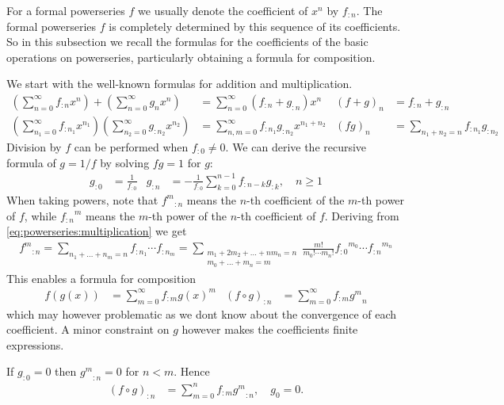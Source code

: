 \documentclass{article}
\numberwithin{equation}{section}
\begin{document}
For a formal powerseries $f$ we usually denote the coefficient of
$x^n$ by $f_{:n}$. The formal powerseries $f$ is completely determined by
this sequence of its coefficients. So in this subsection we 
recall the formulas for the coefficients of the basic operations on
powerseries, particularly obtaining a formula for composition.


We start with the well-known formulas for addition and
multiplication.
\begin{align}
  \left(\sum_{n=0}^\infty f_{:n} x^n\right) + \left(\sum_{n=0}^\infty
    g_n x^n\right)&=\sum_{n=0}^\infty (f_{:n}+g_{:n})x^n & (f+g)_n &=
  f_{:n} + g_{:n}\label{eq:powerseries:addition}\\
  \left(\sum_{n_1=0}^\infty f_{:n_1} x^{n_1}\right)
  \left(\sum_{n_2=0}^\infty g_{:n_2} x^{n_2}\right)&=
  \sum_{n,m=0}^\infty f_{:n_1} g_{:n_2} x^{n_1+n_2} &
(fg)_n &= \sum_{n_1+n_2=n} f_{:n_1} g_{:n_2}\label{eq:powerseries:multiplication}
\end{align}
Division by $f$ can be performed when $f_{:0}\neq 0$. We can derive the
recursive formula of $g=1/f$ by solving $fg=1$ for $g$:
\begin{align*}
  g_{:0} &= \frac{1}{f_{:0}} & g_{:n} &=
  -\frac{1}{f_{:0}}\sum_{k=0}^{n-1} f_{:n-k}
  g_{:k},\quad n\ge 1
\end{align*}
When taking powers, note that ${f^m}_{:n}$ means the $n$-th coefficient of
the $m$-th power of $f$, while ${f_{:n}}^m$ means the $m$-th power of the
$n$-th coefficient of $f$. Deriving from
\eqref{eq:powerseries:multiplication} we get
\begin{align}\label{eq:powerseries:power}
  {f^m}_{:n} = \sum_{n_1+\dots+n_m=n} f_{:n_1}\dotsm f_{:n_m} =
  \sum_{\substack{m_1+2m_2+\dots+nm_n = n\\m_0+\dots+m_n=m}}
    \frac{m!}{m_0!\dotsm m_n!}{f_{:0}}^{m_0}\dotsm {f_{:n}}^{m_n}
\end{align}
This enables a formula for composition
\begin{align*}
  f(g(x))&=\sum_{m=0}^\infty f_{:m} g(x)^m &
  (f\circ g)_{:n} &= \sum_{m=0}^\infty f_{:m} {g^m}_n
\end{align*}
which may however problematic as we dont know about the convergence of
each coefficient. A minor constraint on $g$ however makes the
coefficients finite expressions.

If $g_{:0}=0$ then ${g^m}_{:n} = 0$ for $n<m$. Hence
\begin{align}\label{eq:powerseries:composition}
  (f\circ g)_{:n} &= \sum_{m=0}^n f_{:m} {g^m}_{:n}, \quad g_0=0.
\end{align}
\end{document}
